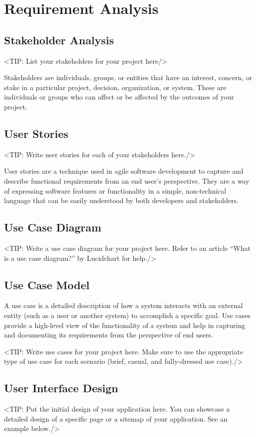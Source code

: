 \chapter{Requirement Analysis}
\label{chap:requirement-analysis}

\section{Stakeholder Analysis}
\label{section:stakeholder-analysis}
<TIP: List your stakeholders for your project here/>

Stakeholders are individuals, groups, or entities that
have an interest, concern, or stake in a particular project, decision,
organization, or system. These are individuals or groups who can affect or be
affected by the outcomes of your project.

\section{User Stories}
\label{section:user-stories}
<TIP: Write user stories for each of your stakeholders here./>

User stories are a technique used in agile software
development to capture and describe functional requirements from an end
user's perspective. They are a way of expressing software features or
functionality in a simple, non-technical language that can be easily understood
by both developers and stakeholders.

\section{Use Case Diagram}
\label{section:use-case-diagram}
<TIP: Write a use case diagram for your project here. Refer to an
article “What is a use case diagram?” by Lucidchart for help./>

\section{Use Case Model}
\label{section:use-case-model}
A use case is a detailed description of how a system
interacts with an external entity (such as a user or another system) to
accomplish a specific goal. Use cases provide a high-level view of the
functionality of a system and help in capturing and documenting its
requirements from the perspective of end users.

<TIP: Write use cases for your project here. Make sure to use the
appropriate type of use case for each scenario (brief, casual, and fully-dressed
use case)./>

\section{User Interface Design}
\label{section:user-interface-design}
<TIP: Put the initial design of your application here. You can
showcase a detailed design of a specific page or a sitemap of your application.
See an example below./>